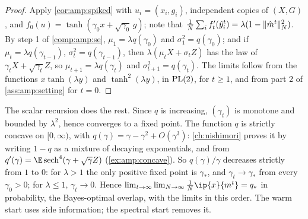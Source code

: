 \begin{refsection}
\begin{proof}
Apply \cref{cor:amp:spiked} with $u_i=(x_i,g_i)$, independent copies of $(X,G)$, and $f_0(u)=\tanh(\gamma_0x+\sqrt{\gamma_0}\,g)$; note that $\frac1N\sum_if_t'(\hat y^t_i)=\lambda(1-\lVert \hat m^t\rVert_N^2)$. By step 1 of \cref{comp:amp:se}, $\mu_1=\lambda q(\gamma_0)$ and $\sigma_1^2=q(\gamma_0)$; and if $\mu_t=\lambda q(\gamma_{t-1})$, $\sigma_t^2=q(\gamma_{t-1})$, then $\lambda(\mu_tX+\sigma_tZ)$ has the law of $\gamma_tX+\sqrt{\gamma_t}Z$, so $\mu_{t+1}=\lambda q(\gamma_t)$ and $\sigma_{t+1}^2=q(\gamma_t)$. The limits follow from the functions $x\tanh(\lambda y)$ and $\tanh^2(\lambda y)$, in $\mathrm{PL}(2)$, for $t\ge1$, and from part 2 of \cref{ass:amp:setting} for $t=0$.
\end{proof}

The scalar recursion does the rest. Since $q$ is increasing, $(\gamma_t)$ is monotone and bounded by $\lambda^2$, hence converges to a fixed point. The function $q$ is strictly concave on $[0,\infty)$, with $q(\gamma)=\gamma-\gamma^2+O(\gamma^3)$: \cref{ch:nishimori} proves it by writing $1-q$ as a mixture of decaying exponentials, and \textcite[App.~B.2]{DeshpandeAbbeMontanari2016} from $q'(\gamma)=\E\operatorname{sech}^4(\gamma+\sqrt\gamma Z)$ (\cref{ex:amp:concave}). So $q(\gamma)/\gamma$ decreases strictly from $1$ to $0$: for $\lambda>1$ the only positive fixed point is $\gamma_*$, and $\gamma_t\to\gamma_*$ from every $\gamma_0>0$; for $\lambda\le1$, $\gamma_t\to0$. Hence $\lim_{t\to\infty}\lim_{N\to\infty}\frac1N\ip{x}{m^t}=q_*$ in probability, the Bayes-optimal overlap, with the limits in this order. The warm start uses side information; the spectral start removes it.


\end{refsection}
